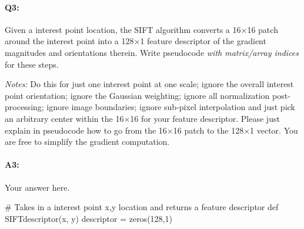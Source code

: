 \pagebreak
\paragraph{Q3:} Given a interest point location, the SIFT algorithm converts a 16$\times$16 patch around the interest point into a 128$\times$1 feature descriptor of the gradient magnitudes and orientations therein. Write pseudocode \emph{with matrix/array indices} for these steps.

\emph{Notes:} Do this for just one interest point at one scale; ignore the overall interest point orientation; ignore the Gaussian weighting; ignore all normalization post-processing; ignore image boundaries; ignore sub-pixel interpolation and just pick an arbitrary center within the 16$\times$16 for your feature descriptor. Please just explain in pseudocode how to go from the 16$\times$16 patch to the 128$\times$1 vector. You are free to simplify the gradient computation.

\paragraph{A3:} Your answer here.


# Takes in a interest point x,y location and returns a feature descriptor
def SIFTdescriptor(x, y)
    descriptor = zeros(128,1)






%
%







